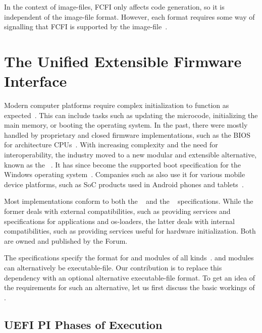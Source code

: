 In the context of \glspl{image-file}, \gls{FCFI} only affects code generation, so it is independent of the \gls{image-file} format. However, each format requires some way of signalling that \gls{FCFI} is supported by the \gls{image-file}~\cite{pe-format}.

\section{The Unified Extensible Firmware Interface}
\label{sec:uefi}

Modern computer platforms require complex initialization to function as expected~\cite{pi-spec}. This can include tasks such as updating the  \gls{microcode}, initializing the main memory, or booting the operating system. In the past, there were mostly handled by proprietary and closed \gls{firmware} implementations, such as the \gls{BIOS} for  architecture \glspl{CPU}~\cite{bios-spec}. With increasing complexity and the need for interoperability, the industry moved to a new modular and extensible alternative, known as the ~\cite{uefi-spec}. It has since become the supported boot specification for the  Windows operating system~\cite{win10-hwreq}. Companies such as  also use it for various mobile device platforms, such as \gls{SoC} products used in Android phones and tablets~\cite{qc-uefi}.

Most  implementations conform to both the ~\cite{pi-spec} and the ~\cite{uefi-spec} specifications. While the former deals with external compatibilities, such as providing services and specifications for applications and \glspl{os-loader}, the latter deals with internal compatibilities, such as providing services useful for hardware initialization. Both are owned and published by the  Forum.

The specifications specify the  format for  and  modules of all kinds~\cite{pi-spec,uefi-spec}.  and  modules can alternatively be  \gls{executable-file}. Our contribution is to replace this dependency with an optional alternative \gls{executable-file} format. To get an idea of the requirements for such an alternative, let us first discuss the basic workings of .

\subsection{UEFI PI Phases of Execution}
\label{sec:pi-phases}

